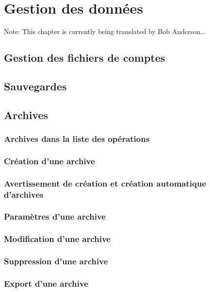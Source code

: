 
\chapter{Gestion des données\label{datamanagement}}

Note: This chapter is currently being translated by Bob Anderson...

\section{Gestion des fichiers de comptes\label{datamanagement-files}}


\section{Sauvegardes\label{datamanagement-backup}}


\section{Archives\label{datamanagement-history}}


\subsection{Archives dans la liste des opérations\label{datamanagement-history-list}}



\subsection{Création d'une archive\label{datamanagement-history-new}}


\subsection{Avertissement de création et création automatique d'archives\label{datamanagement-history-auto}}


\subsection{Paramètres d'une archive\label{datamanagement-history-parameters}}


\subsection{Modification d'une archive\label{datamanagement-history-modify}}


\subsection{Suppression d'une archive\label{datamanagement-history-remove}}

\subsection{Export d'une archive\label{datamanagement-history-export}}










